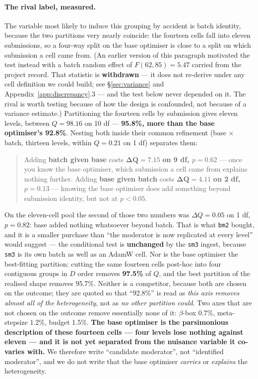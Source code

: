 \documentclass[10pt,letterpaper]{article}
\newcommand{\Dstat}{D}                         %
\newcommand{\arm}[1]{\texttt{#1}}
\begin{document}
\paragraph{The rival label, measured.}
The variable most likely to induce this grouping by accident is batch identity, because the two
partitions very nearly coincide: the fourteen cells fall into eleven submissions, so a four-way
split on the base optimiser is close to a split on which submission a cell came from. (An earlier
version of this paragraph motivated the test instead with a batch random effect of
$F(62,85) = 5.47$ carried from the project record. That statistic is \textbf{withdrawn} --- it
does not re-derive under any cell definition we could build; see \S\ref{sec:variance} and
Appendix~\ref{app:discrepancy}.3 --- and the test below never depended on it. The rival is worth
testing because of how the design is confounded, not because of a variance estimate.)
Partitioning the fourteen cells by submission gives eleven levels,
between $Q = 98.16$ on 10 df --- \textbf{95.8\%, more than the base optimiser's 92.8\%}. Nesting
both inside their common refinement (base $\times$ batch, thirteen levels, within $Q = 0.21$ on
1 df) separates them:

\begin{quote}
Adding \textbf{batch given base} costs $\mathbf{\Delta Q = 7.15}$ \textbf{on 9 df, $p = 0.62$}
--- once you know the base optimiser, which submission a cell came from explains nothing further.
Adding \textbf{base given batch} costs $\mathbf{\Delta Q = 4.11}$ \textbf{on 2 df, $p = 0.13$}
--- knowing the base optimiser does add something beyond submission identity, but not at
$p < 0.05$.
\end{quote}

On the eleven-cell pool the second of those two numbers was $\Delta Q = 0.05$ on 1 df,
$p = 0.82$: base added nothing whatsoever beyond batch. That is what \arm{bm2} bought, and it is
a smaller purchase than ``the moderator is now replicated at every level'' would suggest --- the
conditional test is \textbf{unchanged} by the \arm{sm3} ingest, because \arm{sm3} is its own
batch as well as an AdamW cell. Nor is the base optimiser the best-fitting partition: cutting the
same fourteen cells post-hoc into four contiguous groups in $\Dstat$ order removes
\textbf{97.5\%} of $Q$, and the best partition of the realised shape removes 95.7\%. Neither is a
competitor, because both are chosen on the outcome; they are quoted so that ``92.8\%'' is read as
\emph{this axis removes almost all of the heterogeneity}, not as \emph{no other partition could}.
Two axes that are not chosen on the outcome remove essentially none of it: $\beta$-box 0.7\%,
meta-stepsize 1.2\%, budget 1.5\%. \textbf{The base optimiser is the parsimonious description of
these fourteen cells --- four levels lose nothing against eleven --- and it is not yet separated
from the nuisance variable it co-varies with.} We therefore write ``candidate moderator'', not
``identified moderator'', and we do not write that the base optimiser \emph{carries} or
\emph{explains} the heterogeneity.
\end{document}
